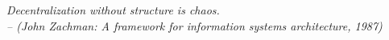 \thispagestyle{empty}
\null\vfill
\begin{center}
\begin{large}
\textsf{
\textit{\glqq{}Decentralization without structure is chaos.\grqq{}\\ -- (John Zachman: A framework for information systems architecture, 1987)}
}
\end{large}
\end{center}
\vfill
\clearpage